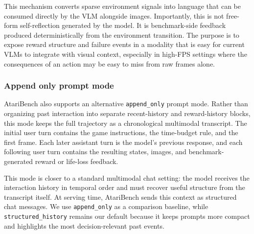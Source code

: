 This mechanism converts sparse environment signals into language that can be consumed directly by the VLM alongside images. Importantly, this is not free-form self-reflection generated by the model. It is benchmark-side feedback produced deterministically from the environment transition. The purpose is to expose reward structure and failure events in a modality that is easy for current VLMs to integrate with visual context, especially in high-FPS settings where the consequences of an action may be easy to miss from raw frames alone.

\subsubsection{Append only prompt mode}

AtariBench also supports an alternative \texttt{append\_only} prompt mode. Rather than organizing past interaction into separate recent-history and reward-history blocks, this mode keeps the full trajectory as a chronological multimodal transcript. The initial user turn contains the game instructions, the time-budget rule, and the first frame. Each later assistant turn is the model's previous response, and each following user turn contains the resulting states, images, and benchmark-generated reward or life-loss feedback.

This mode is closer to a standard multimodal chat setting: the model receives the interaction history in temporal order and must recover useful structure from the transcript itself. At serving time, AtariBench sends this context as structured chat messages. We use \texttt{append\_only} as a comparison baseline, while \texttt{structured\_history} remains our default because it keeps prompts more compact and highlights the most decision-relevant past events.
